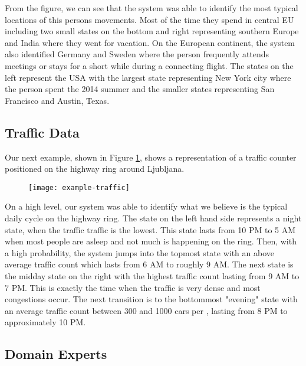 From the figure, we can see that the system was able to identify the most typical locations of this persons
movements. Most of the time they spend in central EU including two small states on the bottom and right
representing southern Europe and India where they went for vacation. On the European continent, the system
also identified Germany and Sweden where the person frequently attends meetings or stays for a short while
during a connecting flight. The states on the left represent the USA with the largest state representing New
York city where the person spent the 2014 summer and the smaller states representing San Francisco and Austin,
Texas.

\subsection{Traffic Data}

Our next example, shown in Figure \ref{fig:example-traffic}, shows a representation of a traffic counter positioned on the highway ring around Ljubljana.
\begin{figure}[h!]
	\centering
	\texttt{[image: example-traffic]}
	\caption{}
	\label{fig:example-traffic}
\end{figure}
On a high level, our system was able to identify what we believe is the typical daily cycle on the highway ring.
The state on the left hand side represents a night state, when the traffic traffic is the lowest. This state
lasts from 10 PM to 5 AM when most people are asleep and not much is happening on the ring. Then, with a high 
probability, the system jumps into the topmost state with an above average traffic count which lasts from 6 AM
to roughly 9 AM. The next state is the midday state on the right with the highest traffic count lasting from 9 AM
to 7 PM. This is exactly the time when the traffic is very dense and most congestions occur. The next transition
is to the bottommost "evening" state with an average traffic count between 300 and 1000 cars per ,
lasting from 8 PM to approximately 10 PM. 

\subsection{Domain Experts}